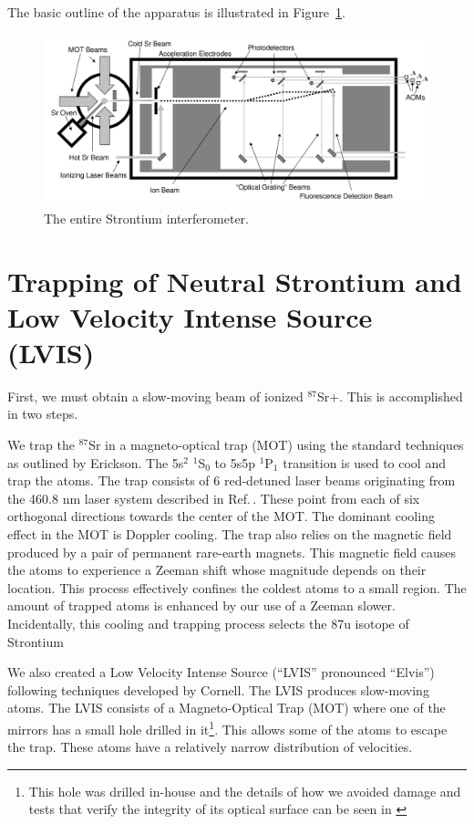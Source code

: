 The basic outline of the apparatus is illustrated in Figure~\ref{fig:IonInterferometer}.

\begin{figure}
\centerline{
\includegraphics[totalheight=0.3\textheight]{interferometer_diagram}
}
\caption[Ion Interferometer]{\label{fig:IonInterferometer}
The entire Strontium interferometer. } 
\end{figure}

\section{Trapping of Neutral Strontium and Low Velocity Intense Source (LVIS)}

First, we must obtain a slow-moving beam of ionized $^{87}$Sr$+$. This is accomplished in two steps. 

We trap the $^{87}$Sr in a magneto-optical trap (MOT) using the standard techniques as outlined by Erickson\cite{cjeDiss}. 
The 5s$^2$ $^1$S$_0$ to 5s5p $^1$P$_1$ transition is used to cool and trap the atoms. 
The trap consists of 6 red-detuned laser beams originating from the 460.8 nm laser system described in Ref.\,\cite{cjeDiss}. These point from each of six orthogonal directions towards the center of the MOT. The dominant cooling effect in the MOT is Doppler cooling. 
The trap also relies on the magnetic field produced by a pair of permanent rare-earth magnets. This magnetic field causes the atoms to experience a Zeeman shift whose magnitude depends on their location. This process effectively confines the coldest atoms to a small region. The amount of trapped atoms is enhanced by our use of a Zeeman slower. Incidentally, this cooling and trapping process selects the 87u isotope of Strontium%

We also created a Low Velocity Intense Source (``LVIS'' pronounced ``Elvis'') \cite{cjeDiss} following techniques developed by Cornell\cite{LVIS}. The LVIS produces slow-moving atoms. The LVIS consists of a Magneto-Optical Trap (MOT) where one of the mirrors has a small hole drilled in it\footnote{This hole was drilled in-house and the details of how we avoided damage and tests that verify the integrity of its optical surface can be seen in \cite{cjeDiss}}. This allows some of the atoms to escape the trap. These atoms have a relatively narrow distribution of velocities. %


